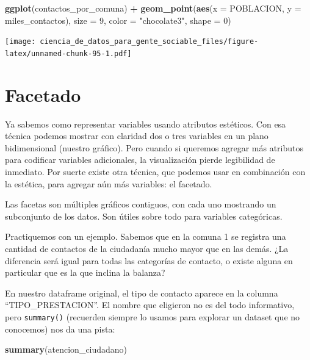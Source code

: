 \documentclass[spanish,]{book}
\newenvironment{Shaded}{\begin{snugshade}}{\end{snugshade}}
\newcommand{\DataTypeTok}[1]{\textcolor[rgb]{0.13,0.29,0.53}{#1}}
\newcommand{\DecValTok}[1]{\textcolor[rgb]{0.00,0.00,0.81}{#1}}
\newcommand{\KeywordTok}[1]{\textcolor[rgb]{0.13,0.29,0.53}{\textbf{#1}}}
\newcommand{\NormalTok}[1]{#1}
\newcommand{\OperatorTok}[1]{\textcolor[rgb]{0.81,0.36,0.00}{\textbf{#1}}}
\newcommand{\StringTok}[1]{\textcolor[rgb]{0.31,0.60,0.02}{#1}}
\begin{document}
\begin{Shaded}
\begin{Highlighting}[]
\KeywordTok{ggplot}\NormalTok{(contactos_por_comuna) }\OperatorTok{+}\StringTok{ }
\StringTok{    }\KeywordTok{geom_point}\NormalTok{(}\KeywordTok{aes}\NormalTok{(}\DataTypeTok{x =}\NormalTok{ POBLACION, }\DataTypeTok{y =}\NormalTok{ miles_contactos), }
               \DataTypeTok{size =} \DecValTok{9}\NormalTok{, }\DataTypeTok{color =} \StringTok{"chocolate3"}\NormalTok{, }\DataTypeTok{shape =} \DecValTok{0}\NormalTok{)}
\end{Highlighting}
\end{Shaded}

\texttt{[image: ciencia\_de\_datos\_para\_gente\_sociable\_files/figure-latex/unnamed-chunk-95-1.pdf]}

\hypertarget{facetado}{%
\section{Facetado}\label{facetado}}

Ya sabemos como representar variables usando atributos estéticos. Con esa técnica podemos mostrar con claridad dos o tres variables en un plano bidimensional (nuestro gráfico). Pero cuando si queremos agregar más atributos para codificar variables adicionales, la visualización pierde legibilidad de inmediato. Por suerte existe otra técnica, que podemos usar en combinación con la estética, para agregar aún más variables: el facetado.

Las facetas son múltiples gráficos contiguos, con cada uno mostrando un subconjunto de los datos. Son útiles sobre todo para variables categóricas.

Practiquemos con un ejemplo. Sabemos que en la comuna 1 se registra una cantidad de contactos de la ciudadanía mucho mayor que en las demás. ¿La diferencia será igual para todas las categorías de contacto, o existe alguna en particular que es la que inclina la balanza?

En nuestro dataframe original, el tipo de contacto aparece en la columna ``TIPO\_PRESTACION''. El nombre que eligieron no es del todo informativo, pero \texttt{summary()} (recuerden siempre lo usamos para explorar un dataset que no conocemos) nos da una pista:

\begin{Shaded}
\begin{Highlighting}[]
\KeywordTok{summary}\NormalTok{(atencion_ciudadano)}
\end{Highlighting}
\end{Shaded}
\end{document}
